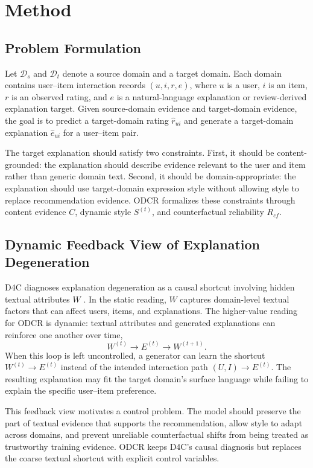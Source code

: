 \section{Method}

\subsection{Problem Formulation}

Let \(\mathcal{D}_s\) and \(\mathcal{D}_t\) denote a source domain and a target
domain. Each domain contains user--item interaction records
\((u,i,r,e)\), where \(u\) is a user, \(i\) is an item, \(r\) is an observed
rating, and \(e\) is a natural-language explanation or review-derived
explanation target. Given source-domain evidence and target-domain evidence,
the goal is to predict a target-domain rating \(\hat r_{ui}\) and generate a
target-domain explanation \(\hat e_{ui}\) for a user--item pair.

The target explanation should satisfy two constraints. First, it should be
content-grounded: the explanation should describe evidence relevant to the
user and item rather than generic domain text. Second, it should be
domain-appropriate: the explanation should use target-domain expression style
without allowing style to replace recommendation evidence. ODCR formalizes
these constraints through content evidence \(C\), dynamic style \(S^{(t)}\),
and counterfactual reliability \(R_{cf}\).

\subsection{Dynamic Feedback View of Explanation Degeneration}

D4C diagnoses explanation degeneration as a causal shortcut involving hidden
textual attributes \(W\) \cite{d4c}. In the static reading, \(W\) captures
domain-level textual factors that can affect users, items, and explanations.
The higher-value reading for ODCR is dynamic: textual attributes and generated
explanations can reinforce one another over time,
\[
  W^{(t)} \rightarrow E^{(t)} \rightarrow W^{(t+1)} .
\]
When this loop is left uncontrolled, a generator can learn the shortcut
\(W^{(t)} \rightarrow E^{(t)}\) instead of the intended interaction path
\((U,I) \rightarrow E^{(t)}\). The resulting explanation may fit the target
domain's surface language while failing to explain the specific user--item
preference.

This feedback view motivates a control problem. The model should preserve the
part of textual evidence that supports the recommendation, allow style to adapt
across domains, and prevent unreliable counterfactual shifts from being treated
as trustworthy training evidence. ODCR keeps D4C's causal diagnosis but
replaces the coarse textual shortcut with explicit control variables.

